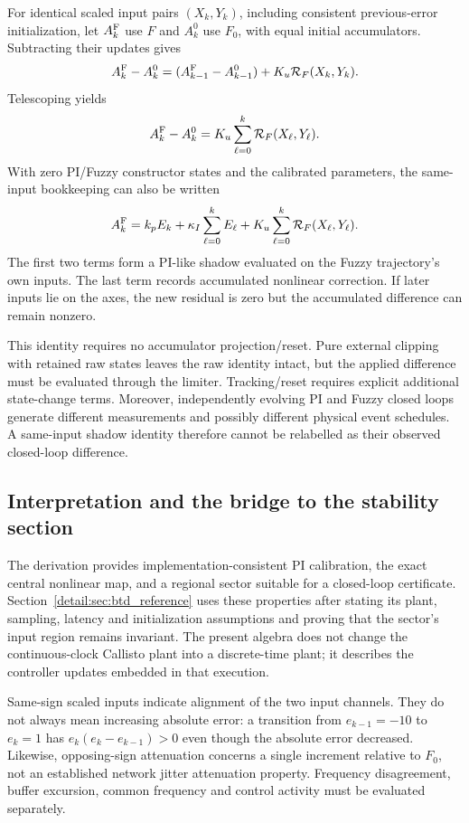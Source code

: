 For identical scaled input pairs $(X_k,Y_k)$, including consistent
previous-error initialization, let $A_k^{\rm F}$ use $F$ and
$A_k^0$ use $F_0$, with equal initial accumulators. Subtracting their
updates gives
\[
 A_k^{\rm F}-A_k^0=(A_{k-1}^{\rm F}-A_{k-1}^0)
                  +K_u\mathcal R_F(X_k,Y_k).
\]
Telescoping yields
\begin{equation}
 A_k^{\rm F}-A_k^0=K_u\sum_{\ell=0}^{k}\mathcal R_F(X_\ell,Y_\ell).
 \label{detail:eq:fpi_memory}
\end{equation}
With zero PI/Fuzzy constructor states and the calibrated parameters,
the same-input bookkeeping can also be written
\begin{equation}
 A_k^{\rm F}=k_pE_k+\kappa_I\sum_{\ell=0}^{k}E_\ell
             +K_u\sum_{\ell=0}^{k}\mathcal R_F(X_\ell,Y_\ell).
 \label{detail:eq:fpd_accounting}
\end{equation}
The first two terms form a PI-like shadow evaluated on the Fuzzy
trajectory's own inputs. The last term records accumulated nonlinear
correction. If later inputs lie on the axes, the new residual is zero
but the accumulated difference can remain nonzero.

This identity requires no accumulator projection/reset. Pure external
clipping with retained raw states leaves the raw identity intact, but the
applied difference must be evaluated through the limiter. Tracking/reset
requires explicit additional state-change terms. Moreover, independently
evolving PI and Fuzzy closed loops generate different measurements and
possibly different physical event schedules. A same-input shadow identity
therefore cannot be relabelled as their observed closed-loop difference.

\subsection{Interpretation and the bridge to the stability section}

The derivation provides implementation-consistent PI calibration,
the exact central nonlinear map, and a regional sector suitable for a
closed-loop certificate. Section~\ref{detail:sec:btd_reference} uses these properties after stating its
plant, sampling, latency and initialization assumptions and proving that
the sector's input region remains invariant. The present algebra does not
change the continuous-clock Callisto plant into a discrete-time plant;
it describes the controller updates embedded in that execution.

Same-sign scaled inputs indicate alignment of the two input channels.
They do not always mean increasing absolute error: a transition from
$e_{k-1}=-10$ to $e_k=1$ has $e_k(e_k-e_{k-1})>0$ even though the
absolute error decreased. Likewise, opposing-sign attenuation concerns a
single increment relative to $F_0$, not an established network jitter
attenuation property. Frequency disagreement, buffer excursion, common
frequency and control activity must be evaluated separately.

